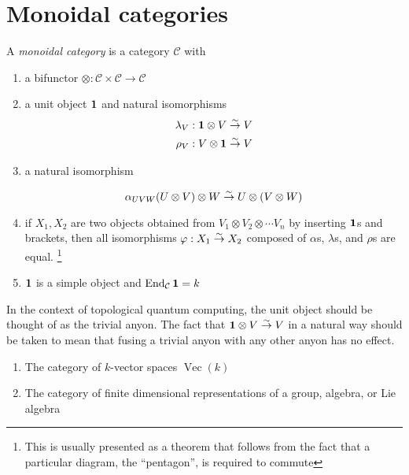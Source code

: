 \section{Monoidal categories}
\begin{defn}
    A \emph{monoidal category} is a category $\mathcal{C}$ with 
    \begin{enumerate}
    \renewcommand{\labelenumi}{\roman{enumi})}
        \item a bifunctor $\otimes: \mathcal{C} \times \mathcal{C} \to
            \mathcal{C}$
        \item a unit object $\mathbf{1}$ and natural isomorphisms
            \begin{align}
                \lambda_V &: \mathbf{1} \otimes V \overset{\sim}{\rightarrow} V \\
                \rho_V &: V \otimes \mathbf{1} \overset{\sim}{\rightarrow} V
            \end{align}
        \item a natural isomorphism 

            \begin{equation}
                \alpha_{UVW} (U \otimes V) \otimes W \overset{\sim}{\rightarrow} U \otimes (V \otimes W)
            \end{equation}

        \item if $X_1, X_2$ are two objects obtained from $V_1 \otimes V_2
            \otimes \cdots V_n$ by inserting $\mathbf{1}$s and brackets, then all
            isomorphisms $\varphi: X_1 \overset{\sim}{\rightarrow} X_2$ composed of $\alpha$s,
            $\lambda$s, and $\rho$s are equal. 
            \footnote{This is usually presented as a theorem that follows from
            the fact that a particular diagram, the ``pentagon'', is required to
            commute}
        \item $\mathbf{1}$ is a simple object and $\operatorname{End}_\mathcal{C} \mathbf{1} = k$
    \end{enumerate}

\end{defn}

In the context of topological quantum computing, the unit object should be
thought of as the trivial anyon. The fact that $\mathbf{1} \otimes V \overset{\sim}{\rightarrow} V$
in a natural way should be taken to mean that fusing a trivial anyon with any
other anyon has no effect.

\begin{example}
    \begin{enumerate}
    \renewcommand{\labelenumi}{\roman{enumi})}
        \item The category of $k$-vector spaces $\operatorname{Vec}(k)$
        \item The category of finite dimensional representations of a group, algebra, or Lie algebra
    \end{enumerate}
\end{example}

